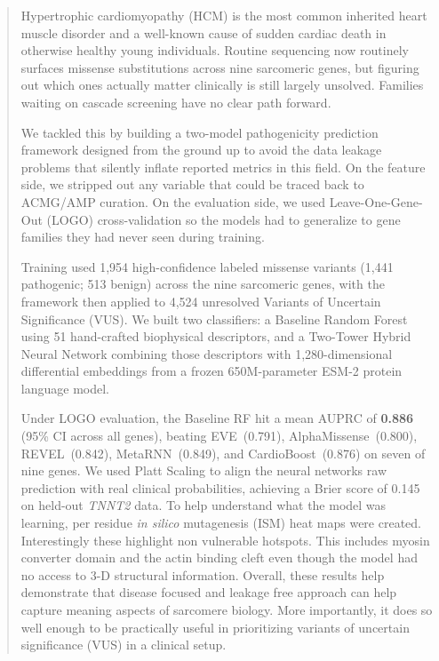 \documentclass[conference]{IEEEtran}
\begin{document}
\begin{abstract}
Hypertrophic cardiomyopathy (HCM) is the most common inherited heart muscle disorder and a well-known cause of sudden cardiac death in otherwise healthy young individuals. Routine sequencing now routinely surfaces missense substitutions across nine sarcomeric genes, but figuring out which ones actually matter clinically is still largely unsolved. Families waiting on cascade screening have no clear path forward.

We tackled this by building a two-model pathogenicity prediction framework designed from the ground up to avoid the data leakage problems that silently inflate reported metrics in this field. On the feature side, we stripped out any variable that could be traced back to ACMG/AMP curation. On the evaluation side, we used Leave-One-Gene-Out (LOGO) cross-validation so the models had to generalize to gene families they had never seen during training.

Training used 1,954 high-confidence labeled missense variants (1,441 pathogenic; 513 benign) across the nine sarcomeric genes, with the framework then applied to 4,524 unresolved Variants of Uncertain Significance (VUS). We built two classifiers: a Baseline Random Forest using 51 hand-crafted biophysical descriptors, and a Two-Tower Hybrid Neural Network combining those descriptors with 1,280-dimensional differential embeddings from a frozen 650M-parameter ESM-2 protein language model.

Under LOGO evaluation, the Baseline RF hit a mean AUPRC of \textbf{0.886} (95\% CI across all genes), beating EVE~(0.791), AlphaMissense~(0.800), REVEL~(0.842), MetaRNN~(0.849), and CardioBoost~(0.876) on seven of nine genes. We used Platt Scaling to align the neural networks raw prediction with real clinical probabilities, achieving a Brier score of 0.145 on held-out \textit{TNNT2} data. To help understand what the model was learning, per residue \textit{in silico} mutagenesis (ISM) heat maps were created. Interestingly these highlight non vulnerable hotspots. This includes myosin converter domain and the actin binding cleft even though the model had no access to 3-D structural information. Overall, these results help demonstrate that disease focused and leakage free approach can help capture meaning aspects of sarcomere biology. More importantly, it does so well enough to be practically useful in prioritizing variants of uncertain significance (VUS) in a clinical setup.
\end{abstract}
\end{document}
